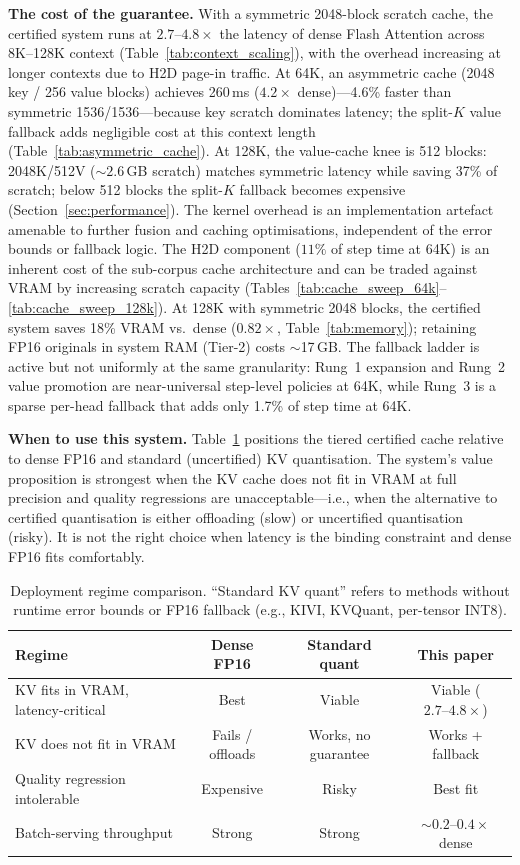 \documentclass[11pt,a4paper]{article}
\theoremstyle{definition}
\theoremstyle{remark}
\begin{document}
\textbf{The cost of the guarantee.}  With a symmetric 2048-block scratch cache, the certified system runs at $2.7\text{--}4.8\times$ the latency of dense Flash Attention across 8K--128K context (Table~\ref{tab:context_scaling}), with the overhead increasing at longer contexts due to H2D page-in traffic.  At 64K, an asymmetric cache (2048 key / 256 value blocks) achieves 260\,ms ($4.2\times$ dense)---4.6\% faster than symmetric 1536/1536---because key scratch dominates latency; the split-$K$ value fallback adds negligible cost at this context length (Table~\ref{tab:asymmetric_cache}).  At 128K, the value-cache knee is 512 blocks: 2048K/512V (${\sim}2.6$\,GB scratch) matches symmetric latency while saving 37\% of scratch; below 512 blocks the split-$K$ fallback becomes expensive (Section~\ref{sec:performance}).  The kernel overhead is an implementation artefact amenable to further fusion and caching optimisations, independent of the error bounds or fallback logic.  The H2D component ($11\%$ of step time at 64K) is an inherent cost of the sub-corpus cache architecture and can be traded against VRAM by increasing scratch capacity (Tables~\ref{tab:cache_sweep_64k}--\ref{tab:cache_sweep_128k}).  At 128K with symmetric 2048 blocks, the certified system saves 18\% VRAM vs.\ dense ($0.82\times$, Table~\ref{tab:memory}); retaining FP16 originals in system RAM (Tier-2) costs $\sim$17\,GB.  The fallback ladder is active but not uniformly at the same granularity: Rung~1 expansion and Rung~2 value promotion are near-universal step-level policies at 64K, while Rung~3 is a sparse per-head fallback that adds only 1.7\% of step time at 64K.

\textbf{When to use this system.}  Table~\ref{tab:regime} positions the tiered certified cache relative to dense FP16 and standard (uncertified) KV quantisation.  The system's value proposition is strongest when the KV cache does not fit in VRAM at full precision and quality regressions are unacceptable---i.e., when the alternative to certified quantisation is either offloading (slow) or uncertified quantisation (risky).  It is not the right choice when latency is the binding constraint and dense FP16 fits comfortably.

\begin{table}[H]
\centering
\caption{Deployment regime comparison.  ``Standard KV quant'' refers to methods without runtime error bounds or FP16 fallback (e.g., KIVI, KVQuant, per-tensor INT8).}
\label{tab:regime}
\small
\begin{tabular}{p{3.8cm}ccc}
\toprule
\textbf{Regime} & \textbf{Dense FP16} & \textbf{Standard quant} & \textbf{This paper} \\
\midrule
KV fits in VRAM, latency-critical & Best & Viable & Viable ($2.7\text{--}4.8\times$) \\
KV does not fit in VRAM & Fails / offloads & Works, no guarantee & Works + fallback \\
Quality regression intolerable & Expensive & Risky & Best fit \\
Batch-serving throughput & Strong & Strong & ${\sim}0.2\text{--}0.4\times$ dense \\
\bottomrule
\end{tabular}
\end{table}
\end{document}
